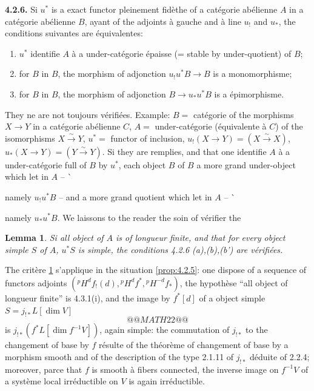 \documentclass[12pt,a4paper]{article}
\theoremstyle{plain}
\newtheorem{lemma}[theorem]{Lemma}
\theoremstyle{definition}
\newcommand{\isom}{\xrightarrow{\sim}}
\begin{document}
\noindent\textbf{4.2.6.} Si $u^{*}$ is a exact functor pleinement fid\`{e}the of a cat\'{e}gorie ab\'{e}lienne $A$ in a cat\'{e}gorie ab\'{e}lienne $B$, ayant of the adjoints \`{a} gauche and \`{a} line $u_{!}$ and $u_{*}$, the conditions suivantes are \'{e}quivalentes:
\begin{enumerate}
\item[(a)] $u^{*}$ identifie $A$ \`{a} a under-cat\'{e}gorie \'{e}paisse (= stable by under-quotient) of $B$;
\item[(b)] for $B$ in $B$, the morphism of adjonction $u_{!}u^{*}B \longrightarrow B$ is a monomorphisme;
\item[(b')] for $B$ in $B$, the morphism of adjonction $B \to u_{*}u^{*}B$ is a \'{e}pimorphisme.
\end{enumerate}
They ne are not toujours v\'{e}rifi\'{e}es. Example: $B =$ cat\'{e}gorie of the morphisms $X \to Y$ in a cat\'{e}gorie ab\'{e}lienne $C$, $A =$ under-cat\'{e}gorie (\'{e}quivalente \`{a} $C$) of the isomorphisms $X \isom Y$, $u^{*} =$ functor of inclusion, $u_{!}(X \to Y) = (X \isom X)$, $u_{*}(X \to Y) = (Y \isom Y)$. Si they are remplies, and that one identifie $A$ \`{a} a under-cat\'{e}gorie full of $B$ by $u^{*}$, each object $B$ of $B$ a more grand under-object which let in $A$ -- \`{namely $u_{!}u^{*}B$ -- and a more grand quotient which let in $A$ -- \`{namely $u_{*}u^{*}B$. We laissons to the reader the soin of v\'{e}rifier the

\begin{lemma}\label{lem:4.2.6.1}
Si all object of $A$ is of longueur finite, and that for every object simple $S$ of $A$, $u^{*}S$ is simple, the conditions 4.2.6 (a),(b),(b') are v\'{e}rifi\'{e}es.
\end{lemma}

The crit\`{e}re \ref{lem:4.2.6.1} s'applique in the situation \ref{prop:4.2.5}: one dispose of a sequence of functors adjoints $({}^{p}H^{d}f_{!}(d), {}^{p}H^{d}f^{*}, {}^{p}H^{-d}f_{*})$, the hypoth\`{e}se ``all object of longueur finite'' is 4.3.1(i), and the image by $f^{*}[d]$ of a object simple $S = j_{!*}L[\dim V]$
\[
@@MATH22@@
\]
is $j_{!*}(f^{*}L[\dim f^{-1}V])$, again simple: the commutation of $j_{!*}$ to the changement of base by $f$ r\'{e}sulte of the th\'{e}or\`{e}me of changement of base by a morphism smooth and of the description of the type 2.1.11 of $j_{!*}$ d\'{e}duite of 2.2.4; moreover, parce that $f$ is smooth \`{a} fibers connected, the inverse image on $f^{-1}V$ of a syst\`{e}me local irr\'{e}ductible on $V$ is again irr\'{e}ductible.

}}
\end{document}
